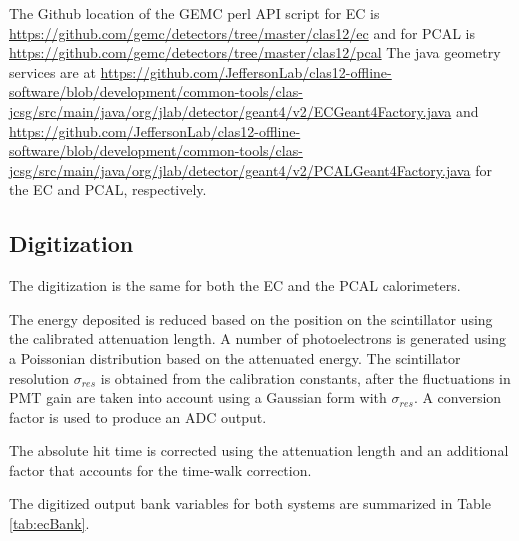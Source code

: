 

The Github location of the GEMC perl API script for EC  is \url{https://github.com/gemc/detectors/tree/master/clas12/ec} and
for PCAL is \url{https://github.com/gemc/detectors/tree/master/clas12/pcal}
The java geometry services are at 
\url{https://github.com/JeffersonLab/clas12-offline-software/blob/development/common-tools/clas-jcsg/src/main/java/org/jlab/detector/geant4/v2/ECGeant4Factory.java} and
\url{https://github.com/JeffersonLab/clas12-offline-software/blob/development/common-tools/clas-jcsg/src/main/java/org/jlab/detector/geant4/v2/PCALGeant4Factory.java}
for the EC and PCAL, respectively.


\subsection{Digitization}
The digitization is the same for both the EC and the PCAL calorimeters.

The energy deposited is reduced based on the position on the scintillator using the calibrated attenuation length.
A number of photoelectrons is generated using a Poissonian distribution based on the attenuated energy.
The scintillator resolution $\sigma_{res}$ is obtained from the calibration constants, after the fluctuations in PMT gain
are taken into account using a Gaussian form with $\sigma_{res}$. A conversion factor is used to produce an ADC output.

The absolute hit time is corrected using the attenuation length and an additional factor that accounts for the time-walk correction.

The digitized output bank variables for both systems are summarized in Table \ref{tab:ecBank}.

